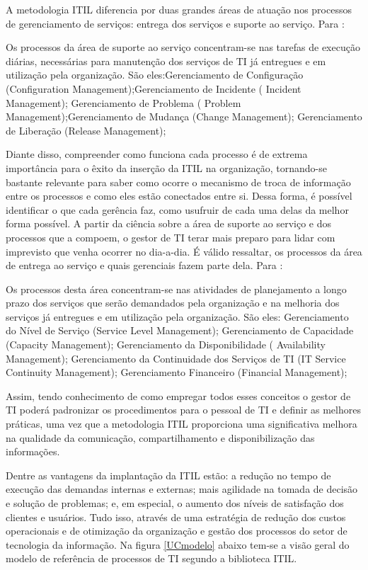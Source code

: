 \documentclass[eso]{bcc}
\begin{document}
A metodologia ITIL diferencia por duas grandes áreas de atuação nos processos de gerenciamento de serviços: entrega dos serviços e suporte ao serviço. Para \cite[p. 67]{magalhaes:2007}:

\begin{quoting}
{\footnotesize
Os processos da área de suporte ao serviço concentram-se nas tarefas de execução diárias, necessárias para manutenção dos serviços de TI já entregues e em utilização pela organização. São eles:Gerenciamento de Configuração (Configuration Management);Gerenciamento de Incidente ( Incident Management); Gerenciamento de Problema ( Problem Management);Gerenciamento de Mudança (Change Management); Gerenciamento de Liberação (Release Management);}
\end{quoting}
Diante disso, compreender como funciona cada processo é de extrema importância para o êxito da inserção da ITIL na organização, tornando-se bastante relevante para saber como ocorre o mecanismo de troca de informação entre os processos e como eles estão conectados entre si. Dessa forma, é possível identificar o que cada gerência faz, como usufruir de cada uma delas da melhor forma possível. A partir da ciência sobre a área de suporte ao serviço  e dos processos que a compoem, o gestor de TI terar mais preparo para lidar com imprevisto que venha ocorrer no dia-a-dia.
É válido ressaltar, os processos da área de entrega ao serviço e quais gerenciais fazem parte dela. Para \cite[p. 67]{magalhaes:2007}: 
\begin{quoting}
{\footnotesize
Os processos desta área concentram-se nas atividades de planejamento a longo prazo dos serviços que serão demandados pela organização e na melhoria dos serviços já entregues e em utilização pela organização. São eles: Gerenciamento do Nível de Serviço (Service Level Management); Gerenciamento de Capacidade (Capacity Management); Gerenciamento da Disponibilidade ( Availability Management); Gerenciamento da Continuidade dos Serviços de TI (IT Service Continuity Management); Gerenciamento Financeiro (Financial Management);
}
\end{quoting}

Assim, tendo conhecimento de como empregar todos esses conceitos o gestor de TI poderá padronizar os procedimentos para o pessoal de TI e definir as melhores práticas, uma vez que a metodologia ITIL proporciona uma significativa melhora na qualidade da comunicação, compartilhamento e disponibilização das informações.

Dentre as vantagens da implantação da ITIL estão: a redução no tempo de execução das demandas internas e externas; mais agilidade na tomada de decisão e solução de problemas; e, em especial, o aumento dos níveis de satisfação dos clientes e usuários. Tudo isso, através de uma estratégia de redução dos custos operacionais e de otimização da organização e gestão dos processos do setor de tecnologia da informação.
Na figura \ref{UCmodelo} abaixo tem-se a visão geral do modelo de referência de processos de TI segundo a biblioteca ITIL.
\end{document}
